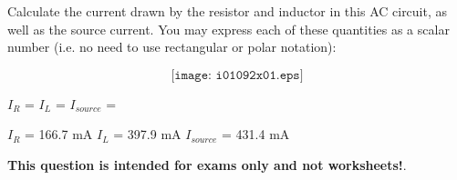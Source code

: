

Calculate the current drawn by the resistor and inductor in this AC circuit, as well as the source current.  You may express each of these quantities as a scalar number (i.e. no need to use rectangular or polar notation):

$$\texttt{[image: i01092x01.eps]}$$

$I_R$ = \hskip 100pt $I_L$ = \hskip 100pt $I_{source}$ = 

\vskip 10pt







$I_R$ = 166.7 mA \hskip 100pt $I_L$ = 397.9 mA \hskip 100pt $I_{source}$ = 431.4 mA







{\bf This question is intended for exams only and not worksheets!}.



